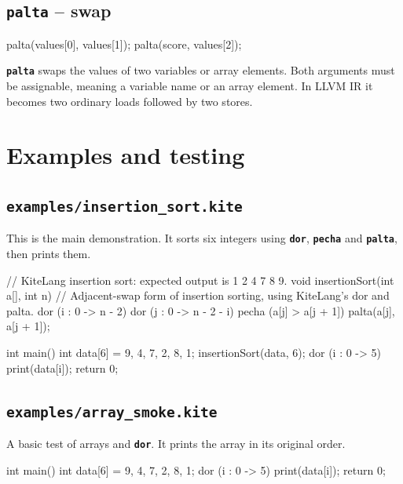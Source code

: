 \documentclass[11pt,a4paper]{article}
\newcommand{\kw}[1]{\texttt{\textcolor{cInput}{\textbf{#1}}}}
\newcommand{\fn}[1]{\texttt{#1}}
\begin{document}
\subsection{\kw{palta} -- swap}

\begin{kite}
palta(values[0], values[1]);
palta(score, values[2]);
\end{kite}

\kw{palta} swaps the values of two variables or array elements. Both arguments must be assignable, meaning a variable name or an array element. In LLVM IR it becomes two ordinary loads followed by two stores.

\section{Examples and testing}

\subsection{\fn{examples/insertion\_sort.kite}}

This is the main demonstration. It sorts six integers using \kw{dor}, \kw{pecha} and \kw{palta}, then prints them.

\begin{kite}
// KiteLang insertion sort: expected output is 1 2 4 7 8 9.
void insertionSort(int a[], int n) {
    // Adjacent-swap form of insertion sorting, using KiteLang's dor and palta.
    dor (i : 0 -> n - 2) {
        dor (j : 0 -> n - 2 - i) {
            pecha (a[j] > a[j + 1]) {
                palta(a[j], a[j + 1]);
            }
        }
    }
}

int main() {
    int data[6] = {9, 4, 7, 2, 8, 1};
    insertionSort(data, 6);
    dor (i : 0 -> 5) {
        print(data[i]);
    }
    return 0;
}
\end{kite}

\subsection{\fn{examples/array\_smoke.kite}}

A basic test of arrays and \kw{dor}. It prints the array in its original order.

\begin{kite}
int main() {
    int data[6] = {9, 4, 7, 2, 8, 1};
    dor (i : 0 -> 5) {
        print(data[i]);
    }
    return 0;
}
\end{kite}
\end{document}
